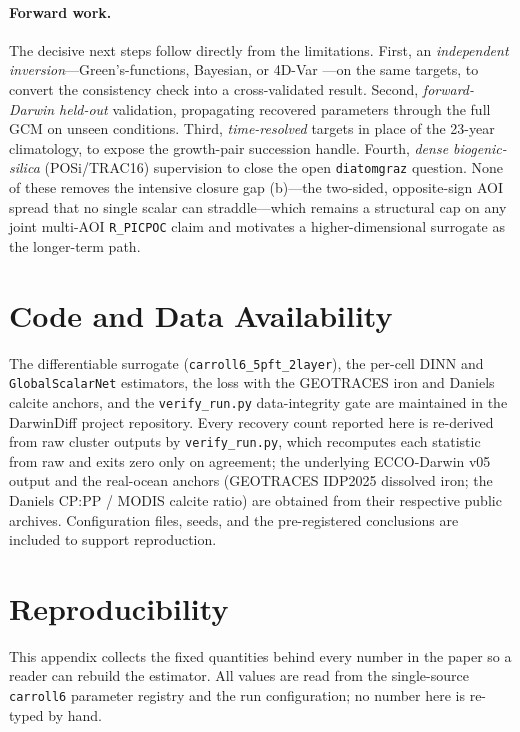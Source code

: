 \documentclass[11pt]{article}
\begin{document}
\paragraph{Forward work.}
The decisive next steps follow directly from the limitations. First, an
\emph{independent inversion}---Green's-functions, Bayesian, or 4D-Var
\cite{heimbach2015}---on the same targets, to convert the consistency check into a
cross-validated result. Second, \emph{forward-Darwin held-out} validation,
propagating recovered parameters through the full GCM on unseen conditions. Third,
\emph{time-resolved} targets in place of the 23-year climatology, to expose the
growth-pair succession handle. Fourth, \emph{dense biogenic-silica} (POSi/TRAC16)
supervision to close the open \texttt{diatomgraz} question. None of these removes
the intensive closure gap (b)---the two-sided, opposite-sign AOI spread that no
single scalar can straddle---which remains a structural cap on any joint multi-AOI
\texttt{R\_PICPOC} claim and motivates a higher-dimensional surrogate as the
longer-term path.

\section{Code and Data Availability}
\label{sec:availability}

The differentiable surrogate (\texttt{carroll6\_5pft\_2layer}), the per-cell DINN
and \texttt{GlobalScalarNet} estimators, the loss with the GEOTRACES iron and
Daniels calcite anchors, and the \texttt{verify\_run.py} data-integrity gate are
maintained in the DarwinDiff project repository. Every recovery count reported
here is re-derived from raw cluster outputs by \texttt{verify\_run.py}, which
recomputes each statistic from raw and exits zero only on agreement; the
underlying ECCO-Darwin v05 output \cite{carroll2022} and the real-ocean anchors
(GEOTRACES IDP2025 dissolved iron; the Daniels CP:PP / MODIS calcite ratio) are
obtained from their respective public archives. Configuration files, seeds, and
the pre-registered conclusions are included to support reproduction.

\appendix

\section{Reproducibility}
\label{sec:appendix-repro}

This appendix collects the fixed quantities behind every number in the paper so a
reader can rebuild the estimator. All values are read from the single-source
\texttt{carroll6} parameter registry and the run configuration; no number here is
re-typed by hand.
\end{document}
